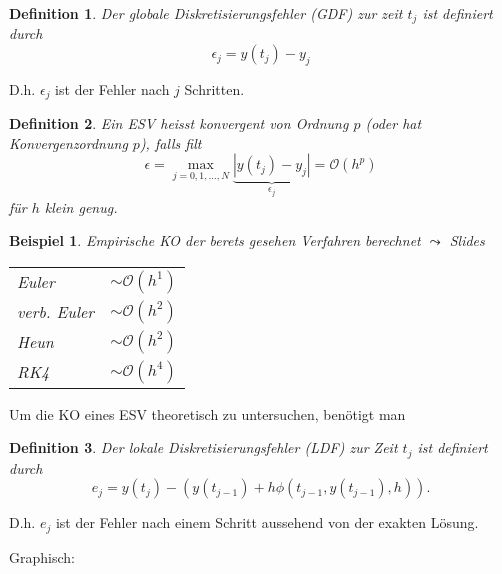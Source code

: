 \documentclass[a4paper]{article}
\newtheorem{defn}{Definition}
\newtheorem{bsp}{Beispiel}
\begin{document}
\begin{defn}
  Der globale Diskretisierungsfehler (GDF) zur zeit $t_j$ ist definiert
  durch
  \[
    \epsilon_j = y(t_j) - y_j
  \]
\end{defn}

D.h. $\epsilon_j$ ist der Fehler nach $j$ Schritten.

\begin{defn}
  Ein ESV heisst konvergent von Ordnung $p$ (oder hat Konvergenzordnung $p$),
  falls filt
  \[
    \epsilon = \max_{j=0,1,\ldots,N} \underbrace{|y(t_j) - y_j|}_{\epsilon_j}
    = \mathcal{O}(h^p)
  \]
  für $h$ klein genug.
\end{defn}

\begin{bsp}
  Empirische KO der berets gesehen Verfahren berechnet $\leadsto$ Slides
  \begin{center}
    \begin{tabular}{lr}
      Euler       & $\sim \mathcal{O}(h^1)$ \\
      verb. Euler & $\sim \mathcal{O}(h^2)$ \\
      Heun        & $\sim \mathcal{O}(h^2)$ \\
      RK4         & $\sim \mathcal{O}(h^4)$
    \end{tabular}
  \end{center}
\end{bsp}

Um die KO eines ESV theoretisch zu untersuchen, benötigt man
\begin{defn}
  Der lokale Diskretisierungsfehler (LDF) zur Zeit $t_j$ ist definiert durch
  \[
    e_j = y(t_j) - \left(
      y(t_{j-1}) + h\phi(t_{j-1}, y(t_{j-1}), h)
    \right).
  \]
\end{defn}
D.h. $e_j$ ist der Fehler nach einem Schritt aussehend von der exakten Lösung.

Graphisch:
\begin{center}
  \skelfig
\end{center}
\end{document}

